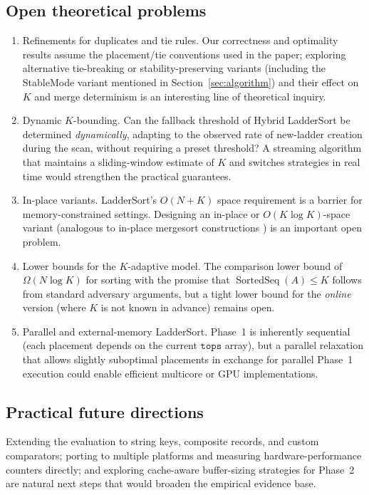 \documentclass[12pt,a4paper]{article}
\theoremstyle{plain}
\theoremstyle{definition}
\DeclareMathOperator{\SortedSeq}{SortedSeq}
\newcommand{\tops}{\texttt{tops}}
\begin{document}
\subsection{Open theoretical problems}
\begin{enumerate}
  \item {Refinements for duplicates and tie rules.}  Our correctness
    and optimality results assume the placement/tie conventions used in the
    paper; exploring alternative tie-breaking or stability-preserving
    variants (including the StableMode variant mentioned in Section~\ref{sec:algorithm})
    and their effect on $K$ and merge determinism is an interesting line of
    theoretical inquiry.

  \item {Dynamic $K$-bounding.}  Can the fallback threshold of Hybrid
    LadderSort be determined \emph{dynamically}, adapting to the observed
    rate of new-ladder creation during the scan, without requiring a
    preset threshold?  A streaming algorithm that maintains a sliding-window
    estimate of $K$ and switches strategies in real time would strengthen the
    practical guarantees.

  \item {In-place variants.}  LadderSort's $O(N+K)$ space requirement
    is a barrier for memory-constrained settings.  Designing an in-place or
    $O(K\log K)$-space variant (analogous to in-place mergesort
    constructions \cite{Franceschini2004}) is an important open problem.

  \item {Lower bounds for the $K$-adaptive model.}  The comparison
    lower bound of $\Omega(N\log K)$ for sorting with the promise that
    $\SortedSeq(A) \le K$ follows from standard adversary arguments, but a
    tight lower bound for the \emph{online} version (where $K$ is not known in
    advance) remains open.

  \item {Parallel and external-memory LadderSort.}  Phase~1 is
    inherently sequential (each placement depends on the current $\tops$
    array), but a parallel relaxation that allows slightly suboptimal placements
    in exchange for parallel Phase~1 execution could enable efficient
    multicore or GPU implementations.
\end{enumerate}

\subsection{Practical future directions}
Extending the evaluation to string keys, composite records, and
custom comparators; porting to multiple platforms and measuring
hardware-performance counters directly; and exploring cache-aware
buffer-sizing strategies for Phase~2 are natural next steps that would
broaden the empirical evidence base.
\end{document}
